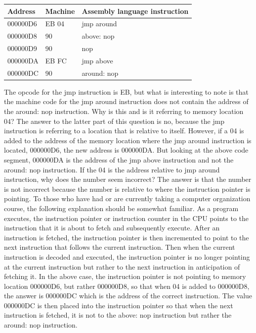 \documentclass[10pt]{book}
\begin{document}
\begin{center}
\begin{tabular}{|l|l|l|}
\hline
Address & Machine & Assembly language instruction \\
\hline
000000D6 & EB 04 & jmp around \\
\hline
000000D8 & 90 & above: nop \\
\hline
000000D9 & 90 & nop \\
\hline
000000DA & EB FC & jmp above \\
\hline
000000DC & 90 & around: nop \\
\hline
\end{tabular}
\end{center}

The opcode for the jmp instruction is EB, but what is interesting to note is that the machine code for the jmp around instruction does not contain the address of the around: nop instruction. Why is this and is it referring to memory location 04? The answer to the latter part of this question is no, because the jmp instruction is referring to a location that is relative to itself. However, if a 04 is added to the address of the memory location where the jmp around instruction is located, 000000D6, the new address is 000000DA. But looking at the above code segment, 000000DA is the address of the jmp above instruction and not the around: nop instruction. If the 04 is the address relative to jmp around instruction, why does the number seem incorrect? The answer is that the number is not incorrect because the number is relative to where the instruction pointer is pointing.
To those who have had or are currently taking a computer organization course, the following explanation should be somewhat familiar. As a program executes, the instruction pointer or instruction counter in the CPU points to the instruction that it is about to fetch and subsequently execute. After an instruction is fetched, the instruction pointer is then incremented to point to the next instruction that follows the current instruction. Then when the current instruction is decoded and executed, the instruction pointer is no longer pointing at the current instruction but rather to the next instruction in anticipation of fetching it. In the above case, the instruction pointer is not pointing to memory location 000000D6, but rather 000000D8, so that when 04 is added to 000000D8, the answer is 000000DC which is the address of the correct instruction. The value 000000DC is then placed into the instruction pointer so that when the next instruction is fetched, it is not to the above: nop instruction but rather the around: nop instruction.
\end{document}
